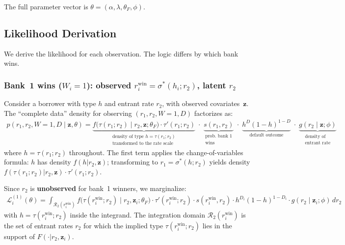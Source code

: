 \documentclass[12pt]{article}
\theoremstyle{plain}
\theoremstyle{plain}
\theoremstyle{definition}  %
\theoremstyle{remark}  %
\begin{document}
\noindent
The full parameter vector is $\theta = (\alpha, \lambda, \theta_F, \phi)$.

\subsection{Likelihood Derivation}\label{sec:likelihood}

We derive the likelihood for each observation. The logic differs by which bank wins.

\subsubsection{Bank~1 wins ($W_i = 1$): observed $r_i^{\text{win}} = \sigma^*(h_i; r_2)$, latent $r_2$}

Consider a borrower with type $h$ and entrant rate $r_2$, with observed covariates~$\mathbf{z}$. The ``complete data'' density for observing $(r_1, r_2, W\!=\!1, D)$ factorizes as:
\begin{align}\label{eq:complete}
    p(r_1, r_2, W\!=\!1, D \mid \mathbf{z}, \theta) = \underbrace{f\!\big(\tau(r_1;r_2) \mid r_2, \mathbf{z};\theta_F\big) \cdot \tau'(r_1;r_2)}_{\substack{\text{density of type } h = \tau(r_1;r_2) \\ \text{transformed to the rate scale}}} \;\cdot\; \underbrace{s(r_1, r_2)}_{\substack{\text{prob.\ bank~1}\\\text{wins}}} \;\cdot\; \underbrace{h^{D}(1\!-\!h)^{1-D}}_{\text{default outcome}} \;\cdot\; \underbrace{g(r_2 \mid \mathbf{z};\phi)}_{\substack{\text{density of}\\ \text{entrant rate}}}
\end{align}
where $h = \tau(r_1; r_2)$ throughout. The first term applies the change-of-variables formula: $h$ has density $f(h|r_2, \mathbf{z})$; transforming to $r_1 = \sigma^*(h;r_2)$ yields density $f(\tau(r_1;r_2)|r_2, \mathbf{z}) \cdot \tau'(r_1;r_2)$.

\medskip\noindent
Since $r_2$ is \textbf{unobserved} for bank~1 winners, we marginalize:
\begin{align}\label{eq:L1}
    \boxed{\mathcal{L}_i^{(1)}(\theta) = \int_{\mathcal{R}_2(r_i^{\text{win}})} f\!\big(\tau(r_i^{\text{win}}; r_2) \mid r_2, \mathbf{z}_i;\theta_F\big) \cdot \tau'(r_i^{\text{win}}; r_2) \cdot s(r_i^{\text{win}}, r_2) \cdot h^{D_i}(1\!-\!h)^{1-D_i} \cdot g(r_2 \mid \mathbf{z}_i;\phi)\, dr_2}
\end{align}
with $h = \tau(r_i^{\text{win}}; r_2)$ inside the integrand. The integration domain $\mathcal{R}_2(r_i^{\text{win}})$ is the set of entrant rates $r_2$ for which the implied type $\tau(r_i^{\text{win}}; r_2)$ lies in the support of $F(\cdot|r_2, \mathbf{z}_i)$.
\end{document}
